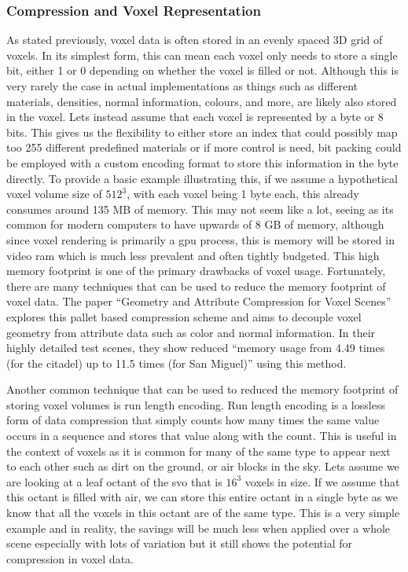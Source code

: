 \documentclass[titlepage]{article}
\begin{document}
\subsubsection{Compression and Voxel Representation}
As stated previously, voxel data is often stored in an evenly spaced 3D grid of voxels. In its simplest form, this can mean each voxel only needs to store a single bit, either 1 or 0 depending on whether the voxel is filled or not. Although this is very rarely the case in actual implementations as things such as different materials, densities, normal information, colours, and more, are likely also stored in the voxel. Lets instead assume that each voxel is represented by a byte or 8 bits. This gives us the flexibility to either store an index that could possibly map too 255 different predefined materials or if more control is need, bit packing could be employed with a custom encoding format to store this information in the byte directly. To provide a basic example illustrating this, if we assume a hypothetical voxel volume size of $512^3$, with each voxel being 1 byte each, this already consumes around 135 MB of memory. This may not seem like a lot, seeing as its common for modern computers to have upwards of 8 GB of memory, although since voxel rendering is primarily a \gls{gpu} process, this is memory will be stored in video \gls{ram} which is much less prevalent and often tightly budgeted. This high memory footprint is one of the primary drawbacks of voxel usage. Fortunately, there are many techniques that can be used to reduce the memory footprint of voxel data. The paper ``Geometry and Attribute Compression for Voxel Scenes'' \cite{compression} explores this pallet based compression scheme and aims to decouple voxel geometry from attribute data such as color and normal information. In their highly detailed test scenes, they show reduced ``memory usage from 4.49 times (for the citadel) up to 11.5 times (for San Miguel)'' using this method.

Another common technique that can be used to reduced the memory footprint of storing voxel volumes is run length encoding. Run length encoding is a lossless form of data compression that simply counts how many times the same value occurs in a sequence and stores that value along with the count. This is useful in the context of voxels as it is common for many of the same type to appear next to each other such as dirt on the ground, or air blocks in the sky. Lets assume we are looking at a leaf octant of the \gls{svo} that is $16^3$ voxels in size. If we assume that this octant is filled with air, we can store this entire octant in a single byte as we know that all the voxels in this octant are of the same type. This is a very simple example and in reality, the savings will be much less when applied over a whole scene especially with lots of variation but it still shows the potential for compression in voxel data.
\end{document}
